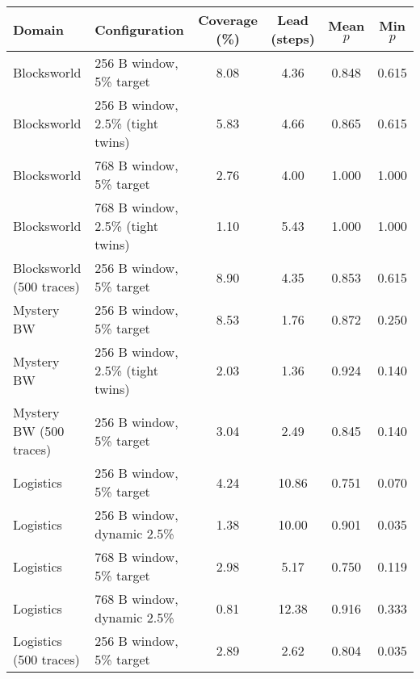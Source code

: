 {\footnotesize
\setlength{\tabcolsep}{4pt}
\begin{tabularx}{\textwidth}{lYcccc}
\toprule
Domain & Configuration & Coverage (\%) & Lead (steps) & Mean $p$ & Min $p$ \\
\midrule
Blocksworld & 256 B window, 5\% target & 8.08 & 4.36 & 0.848 & 0.615 \\
Blocksworld & 256 B window, 2.5\% (tight twins) & 5.83 & 4.66 & 0.865 & 0.615 \\
Blocksworld & 768 B window, 5\% target & 2.76 & 4.00 & 1.000 & 1.000 \\
Blocksworld & 768 B window, 2.5\% (tight twins) & 1.10 & 5.43 & 1.000 & 1.000 \\
Blocksworld (500 traces) & 256 B window, 5\% target & 8.90 & 4.35 & 0.853 & 0.615 \\
Mystery BW & 256 B window, 5\% target & 8.53 & 1.76 & 0.872 & 0.250 \\
Mystery BW & 256 B window, 2.5\% (tight twins) & 2.03 & 1.36 & 0.924 & 0.140 \\
Mystery BW (500 traces) & 256 B window, 5\% target & 3.04 & 2.49 & 0.845 & 0.140 \\
Logistics & 256 B window, 5\% target & 4.24 & 10.86 & 0.751 & 0.070 \\
Logistics & 256 B window, dynamic 2.5\% & 1.38 & 10.00 & 0.901 & 0.035 \\
Logistics & 768 B window, 5\% target & 2.98 & 5.17 & 0.750 & 0.119 \\
Logistics & 768 B window, dynamic 2.5\% & 0.81 & 12.38 & 0.916 & 0.333 \\
Logistics (500 traces) & 256 B window, 5\% target & 2.89 & 2.62 & 0.804 & 0.035 \\
\bottomrule
\end{tabularx}}
